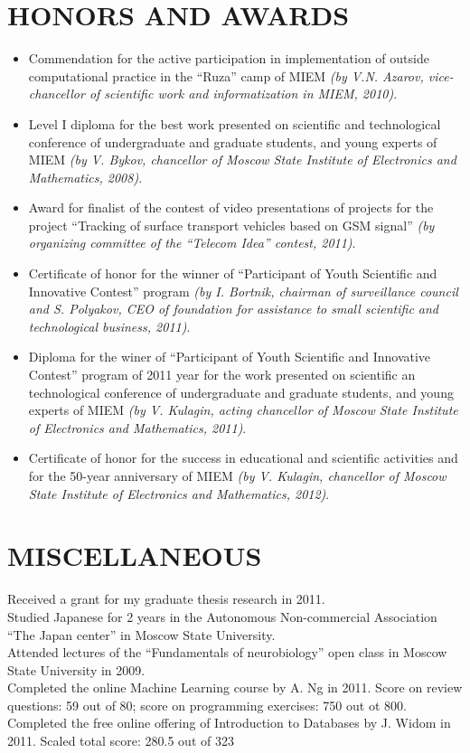 \documentclass{res}
\begin{document}
\begin{resume}
\section{HONORS AND AWARDS}          
\begin{itemize}
	\item
		Commendation for the active participation in implementation of outside computational practice in the ``Ruza'' camp of MIEM \emph{(by V.N. Azarov, vice-chancellor of scientific work and informatization in MIEM, 2010)}.
	\item
		Level I diploma for the best work presented on scientific and technological conference of undergraduate and graduate students, and young experts of MIEM \emph{(by V. Bykov, chancellor of Moscow State Institute of Electronics and Mathematics, 2008)}.
	\item
		Award for finalist of the contest of video presentations of projects for the project ``Tracking of surface transport vehicles based on GSM signal'' \emph{(by organizing committee of the ``Telecom Idea'' contest, 2011)}.
	\item
		Certificate of honor for the winner of ``Participant of Youth Scientific and Innovative Contest'' program \emph{(by I. Bortnik, chairman of surveillance council and S. Polyakov, CEO of foundation for assistance to small scientific and technological business, 2011)}.
	\item
		Diploma for the winer of ``Participant of Youth Scientific and Innovative Contest'' program of 2011 year for the work presented on scientific an technological conference of undergraduate and graduate students, and young experts of MIEM \emph{(by V. Kulagin, acting chancellor of Moscow State Institute of Electronics and Mathematics, 2011)}.
	\item
		Certificate of honor for the success in educational and scientific activities and for the 50-year anniversary of MIEM \emph{(by V. Kulagin, chancellor of Moscow State Institute of Electronics and Mathematics, 2012)}.
\end{itemize}


\section{MISCELLANEOUS}          
 
Received a grant for my graduate thesis research in 2011.\\
Studied Japanese for 2 years in the Autonomous Non-commercial Association ``The Japan center'' in Moscow State University.\\
Attended lectures of the ``Fundamentals of neurobiology'' open class in Moscow State University in 2009.\\
Completed the online Machine Learning course by A. Ng in 2011. Score on review questions: 59 out of 80; score on programming exercises: 750 out ot 800.\\
Completed the free online offering of Introduction to Databases by J. Widom in 2011. Scaled total score: 280.5 out of 323

\end{resume}
\end{document}
